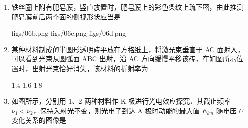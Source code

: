 \documentclass[\gkver]{gaokaozhenti}
\begin{document}
\begin{enumerate}
{

导线的有效长度为 $2L$，则所受的安培力大小 $F = 2BIL$。

设绳子的张力为 $T$，由几何关系可知 $T = \frac{F}{2}$。

解得 $T = BIL$。

故 A 正确，BCD 错误。

故选 A。
}

\item
铁丝圈上附有肥皂膜，竖直放置时，肥皂膜上的彩色条纹上疏下密，由此推测肥皂膜前后两个面的侧视形状应当是

{figs/06b.png}
{figs/06c.png}
{figs/06d.png}


\item
某种材料制成的半圆形透明砖平放在方格纸上，将激光束垂直于 AC 面射入，可以看到光束从圆弧面 ABC 出射，沿 AC 方向缓慢平移该砖，在如图所示位置时，出射光束恰好消失，该材料的折射率为


{1.4}
{1.6}
{1.8}


\item
如图所示，分别用 1、2 两种材料作 K 极进行光电效应探究，其截止频率 $\nu_{1}<\nu_{2}$，保持入射光不变，则光电子到达 A 极时动能的最大值 $E_{km}$ 随电压 $U$ 变化关系的图像是


\end{enumerate}
\end{document}
